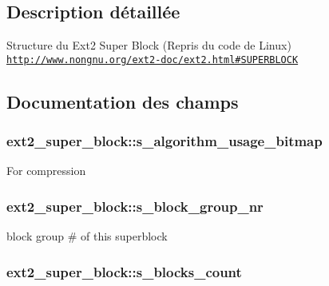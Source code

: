 \subsection{Description détaillée}
Structure du Ext2 Super Block (Repris du code de Linux) \href{http://www.nongnu.org/ext2-doc/ext2.html#SUPERBLOCK}{\tt http\-://www.\-nongnu.\-org/ext2-\/doc/ext2.\-html\#\-S\-U\-P\-E\-R\-B\-L\-O\-C\-K} 

\subsection{Documentation des champs}
\hypertarget{structext2__super__block_ab3772dfdb48734922447cc462e5495ed}{
\subsubsection[{s\-\_\-algorithm\-\_\-usage\-\_\-bitmap}]{ ext2\-\_\-super\-\_\-block\-::s\-\_\-algorithm\-\_\-usage\-\_\-bitmap}}\label{structext2__super__block_ab3772dfdb48734922447cc462e5495ed}
For compression \hypertarget{structext2__super__block_aa69ff4c80207a79de2464e3065df607c}{
\subsubsection[{s\-\_\-block\-\_\-group\-\_\-nr}]{ ext2\-\_\-super\-\_\-block\-::s\-\_\-block\-\_\-group\-\_\-nr}}\label{structext2__super__block_aa69ff4c80207a79de2464e3065df607c}
block group \# of this superblock \hypertarget{structext2__super__block_a3878ffaff13c625cce6b825ecb797547}{
\subsubsection[{s\-\_\-blocks\-\_\-count}]{ ext2\-\_\-super\-\_\-block\-::s\-\_\-blocks\-\_\-count}}\label{structext2__super__block_a3878ffaff13c625cce6b825ecb797547}
